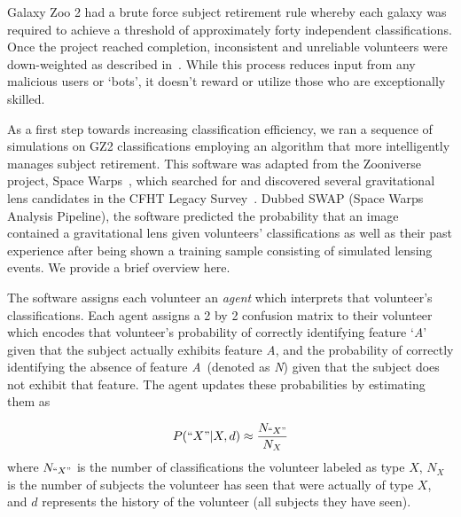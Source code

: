 \documentclass[twocolumn]{aastex6}
\newcommand{\A}{\textit{A}}
\newcommand{\N}{\textit{N}}
\begin{document}
Galaxy Zoo 2 had a brute force subject retirement rule whereby each galaxy 
was required to achieve a threshold of approximately forty independent classifications. 
Once the project reached completion, inconsistent and unreliable volunteers were
down-weighted as described in~\cite{Willett2013}.
While this process reduces input from any malicious users or `bots', it doesn't reward
 or utilize those who are exceptionally skilled. 

As a first step towards increasing classification efficiency, we ran a sequence of 
simulations on GZ2 classifications employing an algorithm that more intelligently
manages subject retirement. This software was adapted from the Zooniverse project, 
Space Warps~\citep{Marshall2016}, which searched for and discovered several 
gravitational lens candidates in the CFHT Legacy Survey~\citep{More2016}.  
Dubbed SWAP (Space Warps Analysis Pipeline),  
the software predicted the probability that an image contained a gravitational lens given 
volunteers' classifications as well as their past experience after being shown a training
sample consisting of simulated lensing events.  We provide a brief overview here.  

The software assigns each volunteer an \textit{agent} which interprets that volunteer's 
classifications. Each agent assigns a 2 by 2 confusion matrix to their volunteer which encodes
that volunteer's probability of correctly identifying feature `\A'  given that the subject 
actually exhibits feature \A, and the probability of correctly identifying
the absence of feature \A~(denoted as \N) given that the subject does not exhibit 
that feature. The agent updates these probabilities by estimating them as 

\begin{equation}
P(``X" | X, d) \approx \frac{N_{``X"}}{N_{X}}
\end{equation}
where $N_{``X"}$ is the number of classifications the volunteer labeled as type $X$, 
$N_X$ is the number of subjects the volunteer has seen that were actually of type $X$,
and $d$ represents the history of the volunteer (all subjects they have seen). 
\end{document}
